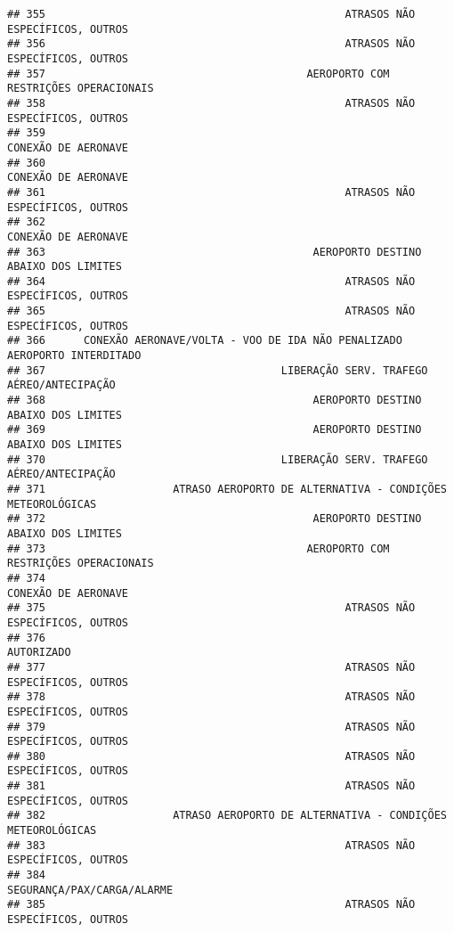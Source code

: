 \documentclass[
]{article}
\begin{document}
\begin{verbatim}
## 355                                               ATRASOS NÃO ESPECÍFICOS, OUTROS
## 356                                               ATRASOS NÃO ESPECÍFICOS, OUTROS
## 357                                         AEROPORTO COM RESTRIÇÕES OPERACIONAIS
## 358                                               ATRASOS NÃO ESPECÍFICOS, OUTROS
## 359                                                           CONEXÃO DE AERONAVE
## 360                                                           CONEXÃO DE AERONAVE
## 361                                               ATRASOS NÃO ESPECÍFICOS, OUTROS
## 362                                                           CONEXÃO DE AERONAVE
## 363                                          AEROPORTO DESTINO ABAIXO DOS LIMITES
## 364                                               ATRASOS NÃO ESPECÍFICOS, OUTROS
## 365                                               ATRASOS NÃO ESPECÍFICOS, OUTROS
## 366      CONEXÃO AERONAVE/VOLTA - VOO DE IDA NÃO PENALIZADO AEROPORTO INTERDITADO
## 367                                     LIBERAÇÃO SERV. TRAFEGO AÉREO/ANTECIPAÇÃO
## 368                                          AEROPORTO DESTINO ABAIXO DOS LIMITES
## 369                                          AEROPORTO DESTINO ABAIXO DOS LIMITES
## 370                                     LIBERAÇÃO SERV. TRAFEGO AÉREO/ANTECIPAÇÃO
## 371                    ATRASO AEROPORTO DE ALTERNATIVA - CONDIÇÕES METEOROLÓGICAS
## 372                                          AEROPORTO DESTINO ABAIXO DOS LIMITES
## 373                                         AEROPORTO COM RESTRIÇÕES OPERACIONAIS
## 374                                                           CONEXÃO DE AERONAVE
## 375                                               ATRASOS NÃO ESPECÍFICOS, OUTROS
## 376                                                                    AUTORIZADO
## 377                                               ATRASOS NÃO ESPECÍFICOS, OUTROS
## 378                                               ATRASOS NÃO ESPECÍFICOS, OUTROS
## 379                                               ATRASOS NÃO ESPECÍFICOS, OUTROS
## 380                                               ATRASOS NÃO ESPECÍFICOS, OUTROS
## 381                                               ATRASOS NÃO ESPECÍFICOS, OUTROS
## 382                    ATRASO AEROPORTO DE ALTERNATIVA - CONDIÇÕES METEOROLÓGICAS
## 383                                               ATRASOS NÃO ESPECÍFICOS, OUTROS
## 384                                                    SEGURANÇA/PAX/CARGA/ALARME
## 385                                               ATRASOS NÃO ESPECÍFICOS, OUTROS

\end{verbatim}
\end{document}
